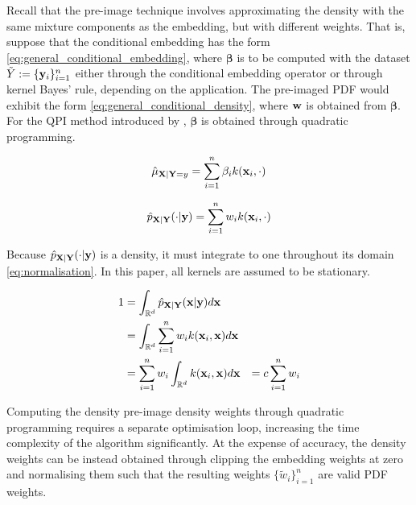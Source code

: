 \documentclass[twoside]{article} \usepackage{aistats2017}
\theoremstyle{definition}
\theoremstyle{theorem}
\newcommand{\ds}[1]{\tilde{#1}}
\newcommand{\qpi}{QPI }
\begin{document}
		Recall that the pre-image technique involves approximating the density with the same mixture components as the embedding, but with different weights. That is, suppose that the conditional embedding has the form \eqref{eq:general_conditional_embedding}, where $\bm{\beta}$ is to be computed with the dataset $\ds{Y} := \{\bvec{y}_{i}\}_{i = 1}^{n}$ either through the conditional embedding operator or through kernel Bayes' rule, depending on the application. The pre-imaged PDF would exhibit the form \eqref{eq:general_conditional_density}, where $\mathbf{w}$ is obtained from $\bm{\beta}$. For the \qpi method introduced by \cite{mccalman2013multi}, $\bm{\beta}$ is obtained through quadratic programming.

		\begin{equation}
			\hat{\mu}_{\mathbf{X} | \mathbf{Y} = y}= \sum_{i = 1}^{n} \beta_{i} k(\mathbf{x}_{i}, \cdot)
		\label{eq:general_conditional_embedding}
		\end{equation}
		
		\begin{equation}
			\hat{p}_{\mathbf{X} | \mathbf{Y}}(\cdot | \mathbf{y}) = \sum_{i = 1}^{n} w_{i} k(\mathbf{x}_{i}, \cdot)
		\label{eq:general_conditional_density}
		\end{equation}
		
		Because $\hat{p}_{\mathbf{X} | \mathbf{Y}}(\cdot | \mathbf{y})$ is a density, it must integrate to one throughout its domain \eqref{eq:normalisation}. In this paper, all kernels are assumed to be stationary.
		
		\begin{equation}
			\begin{aligned}
				1 &= \int_{\mathbb{R}^{d}} \hat{p}_{\mathbf{X} | \mathbf{Y}}(\mathbf{x} | \mathbf{y}) d\mathbf{x} \\
				&= \int_{\mathbb{R}^{d}} \sum_{i = 1}^{n} w_{i} k(\mathbf{x}_{i}, \mathbf{x}) d\mathbf{x} \\
				&= \sum_{i = 1}^{n} w_{i} \int_{\mathbb{R}^{d}} k(\mathbf{x}_{i}, \mathbf{x}) d\mathbf{x}
				&= c \sum_{i = 1}^{n} w_{i}
			\end{aligned}
		\label{eq:normalisation}
		\end{equation}

		Computing the density pre-image density weights through quadratic programming requires a separate optimisation loop, increasing the time complexity of the algorithm significantly. At the expense of accuracy, the density weights can be instead obtained through clipping the embedding weights at zero and normalising them such that the resulting weights $\{\tilde{w}_{i}\}_{i = 1}^{n}$ are valid PDF weights.
\end{document}
